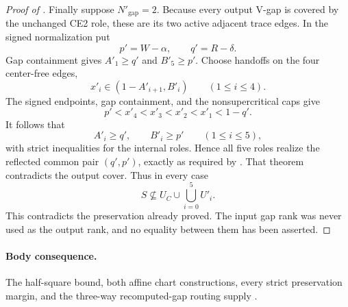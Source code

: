 \begin{proof}[Proof of ]
Finally suppose $N'_{\mathrm{gap}}=2$.  Because every output V-gap is covered
by the unchanged CE2 role, these are its two active adjacent trace edges.
In the signed normalization put
\[
 p'=W-\alpha,
 \qquad q'=R-\delta.
\]
Gap containment gives $A'_1\ge q'$ and $B'_5\ge p'$.  Choose handoffs on the
four center-free edges,
\[
 x'_i\in(1-A'_{i+1},B'_i)
 \qquad(1\le i\le4).
\]
The signed endpoints, gap containment, and the nonsupercritical caps give
\[
 p'<x'_4<x'_3<x'_2<x'_1<1-q'.
\]
It follows that
\[
 A'_i\ge q',
 \qquad B'_i\ge p'
 \qquad(1\le i\le5),
\]
with strict inequalities for the internal roles.  Hence all five roles
realize the reflected common pair $(q',p')$, exactly as required by
.  That theorem contradicts the output cover.
Thus in every case
\[
 S\nsubseteq U_C\cup\bigcup_{i=0}^5U'_i.
\]
This contradicts the preservation already proved.  The input gap rank was
never used as the output rank, and no equality between them has been
asserted.
\end{proof}

\paragraph{Body consequence.}
The half-square bound, both affine chart constructions, every strict
preservation margin, and the three-way recomputed-gap routing supply
.
